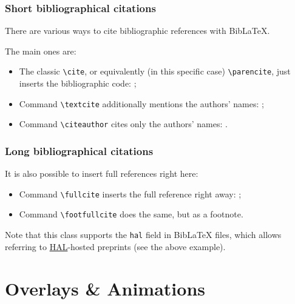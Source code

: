 \documentclass[10pt,    %
    english,            %
    xcolor=table,       %
    envcountsect,       %
    aspectratio=43      %
]{beamer}
\begin{document}
\begin{frame}
    \frametitle{Short bibliographical citations} 
    
    There are various ways to cite bibliographic references with BibLaTeX.
    
    The main ones are:
    \begin{itemize}
        \item The classic \texttt{\textbackslash{}cite}, or equivalently (in this specific case) \texttt{\textbackslash{}parencite}, just inserts the bibliographic code: \cite{Cossu2016};
        \item Command \texttt{\textbackslash{}textcite} additionally mentions the authors' names: \textcite{Cossu2016};
        \item Command \texttt{\textbackslash{}citeauthor} cites only the authors' names: \citeauthor{Cossu2016}.
    \end{itemize}
\end{frame}

\begin{frame}
    \frametitle{Long bibliographical citations} 
    
    It is also possible to insert full references right here:
    \begin{itemize}
        \item Command \texttt{\textbackslash{}fullcite} inserts the full reference right away: ;
        \item Command \texttt{\textbackslash{}footfullcite} does the same, but as a footnote.
    \end{itemize}
    
    Note that this class supports the \texttt{hal} field in BibLaTeX files, which allows referring to \href{https://hal.archives-ouvertes.fr/}{HAL}-hosted preprints (see the above example).
\end{frame}










\section{Overlays \& Animations}
\label{sec:animations}
\sectionframe

\end{document}
